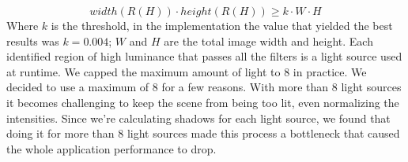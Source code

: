 \begin{equation}
    width(R(H)) \cdot height(R(H)) \geq k \cdot W \cdot H
\end{equation}
Where $k$ is the threshold, in the implementation the value that yielded the best results was $k = 0.004$; $W$ and $H$ are the total image width and height.\newline
Each identified region of high luminance that passes all the filters is a light source used at runtime. We capped the maximum amount of light to 8 in practice. We decided to use a maximum of 8 for a few reasons. With more than 8 light sources it becomes challenging to keep the scene from being too lit, even normalizing the intensities. Since we're calculating shadows for each light source, we found that doing it for more than 8 light sources made this process a bottleneck that caused the whole application performance to drop. \newline

